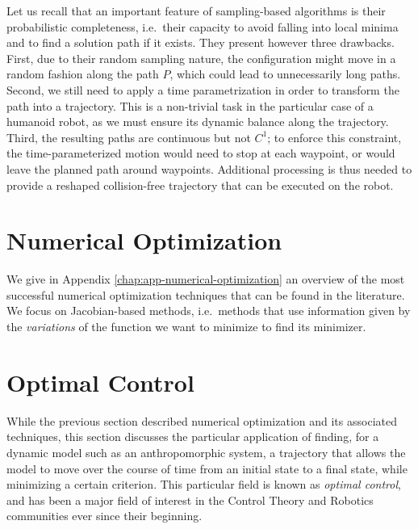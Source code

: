 Let us recall that an important feature of sampling-based algorithms
is their probabilistic completeness, i.e.\ their capacity to avoid
falling into local minima and to find a solution path if it
exists. They present however three drawbacks. First, due to their
random sampling nature, the configuration \config{} might move in a
random fashion along the path $P$, which could lead to unnecessarily
long paths. Second, we still need to apply a time parametrization in
order to transform the path into a trajectory. This is a non-trivial
task in the particular case of a humanoid robot, as we must ensure its
dynamic balance along the trajectory. Third, the resulting paths are
continuous but not $C^1$; to enforce this constraint, the
time-parameterized motion would need to stop at each waypoint, or
would leave the planned path around waypoints. Additional processing
is thus needed to provide a reshaped collision-free trajectory that
can be executed on the robot.

\section{Numerical Optimization}

We give in Appendix \ref{chap:app-numerical-optimization} an overview
of the most successful numerical optimization techniques that can be
found in the literature. We focus on Jacobian-based methods,
i.e.\ methods that use information given by the \emph{variations} of
the function we want to minimize to find its minimizer.

\section{Optimal Control}

While the previous section described numerical optimization and its
associated techniques, this section discusses the particular
application of finding, for a dynamic model such as an anthropomorphic
system, a trajectory that allows the model to move over the course of
time from an initial state to a final state, while minimizing a
certain criterion. This particular field is known as \emph{optimal
  control}, and has been a major field of interest in the Control
Theory and Robotics communities ever since their beginning.

\bigskip

